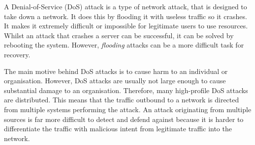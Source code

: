 \raggedright

A Denial-of-Service (DoS)\textsuperscript{\cite{douligeris2004ddos}} attack is a type of network attack, that is designed to take down a network. It does this by flooding it with useless traffic so it crashes. It makes it extremely difficult or impossible for legitimate users to use resources. Whilst an attack that crashes a server can be successful, it can be solved by rebooting the system. However, \textit{flooding} attacks can be a more difficult task for recovery.

\vspace{0.5cm}

The main motive behind DoS attacks is to cause harm to an individual or organisation. However, DoS attacks are usually not large enough to cause substantial damage to an organisation. Therefore, many high-profile DoS attacks are distributed. This means that the traffic outbound to a network is directed from multiple systems performing the attack. An attack originating from multiple sources is far more difficult to detect and defend against because it is harder to differentiate the traffic with malicious intent from legitimate traffic into the network.